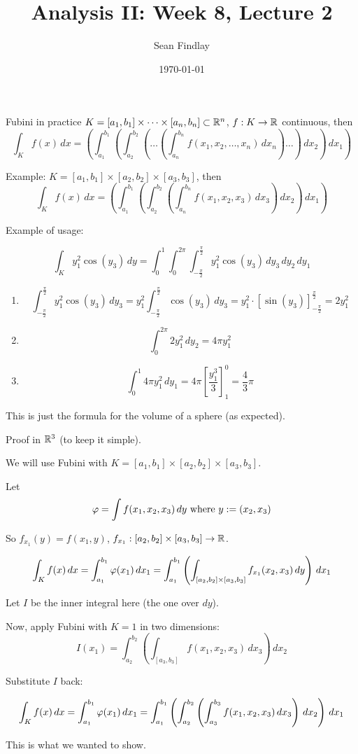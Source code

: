 \documentclass[12pt]{article}
\title{Analysis II: Week 8, Lecture 2}
\author{Sean Findlay}
\date{\today}
\begin{document}
\maketitle

\begin{corollary}{Fubini in practice}{}
$K = [a_1,b_1] \times \dots \times [a_n, b_n] \subset \mathbb{R}^n$, $f: K \rightarrow \mathbb{R}$ continuous, then $$
\int_{K} f(x) \,dx = \left(\int_{a_1}^{b_1} \left(\int_{a_2}^{b_2} \left(\dots \left(\int_{a_n}^{b_n} f(x_1, x_2, \dots, x_n) \,dx_n\right) \dots \right) \,dx_2\right) \,dx_1\right)
$$
\end{corollary}

Example: $K = [a_1,b_1] \times [a_2, b_2] \times [a_3, b_3]$, then 
$$
\int_{K} f(x) \,dx = \left(\int_{a_1}^{b_1} \left(\int_{a_2}^{b_2} \left(\int_{a_n}^{b_n} f(x_1, x_2, x_3) \,dx_3\right) \,dx_2\right) \,dx_1\right)
$$

Example of usage:

$$
\int_{K} y_1^2 \cos(y_3) \,dy = \int_{0}^{1} \int_{0}^{2\pi} \int_{-\frac{\pi}{2}}^{\frac{\pi}{2}} y_1^2 \cos(y_3) \,dy_3 \,dy_2 \,dy_1
$$

\begin{enumerate}
    \item $$
    \int_{-\frac{\pi}{2}}^{\frac{\pi}{2}} y_1^2 \cos(y_3) \,dy_3 = y_1^2 \int_{-\frac{\pi}{2}}^{\frac{\pi}{2}} \cos(y_3) \,dy_3 = y_1^2 \cdot [\sin(y_3)]_{-\frac{\pi}{2}}^{\frac{\pi}{2}} = 2y_1^2
    $$
    \item $$
    \int_{0}^{2\pi} 2y_1^2 \,dy_2 = 4\pi y_1^2
    $$
    \item $$
    \int_{0}^{1}4\pi y_1^2 \,dy_1 = 4 \pi [\frac{y_1^3}{3}]_{1}^{0} = \frac{4}{3}\pi
    $$
\end{enumerate}

This is just the formula for the volume of a sphere (as expected).

\begin{proofbox}
Proof in $\mathbb{R}^3$ (to keep it simple).

We will use Fubini with $K = [a_1,b_1] \times [a_2, b_2] \times [a_3, b_3]$.

Let 
$$
\varphi = \int f(x_1, x_2, x_3) \,dy \text{ where } y  := (x_2, x_3)
$$

So $f_{x_1}(y) = f(x_1, y)$, $f_{x_1}: [a_2, b_2] \times [a_3, b_3] \rightarrow \mathbb{R}$.

$$
\int_{K} f(x) \,dx = \int_{a_1}^{b_1} \varphi(x_1) \,dx_1 = \int_{a_1}^{b_1} \left(\int_{[a_2, b_2] \times [a_3, b_3]} f_{x_1}(x_2, x_3) \,dy\right) \,dx_1
$$

Let $I$ be the inner integral here (the one over $dy$).

Now, apply Fubini with $K = 1$ in two dimensions:
$$
I(x_1) = \int_{a_2}^{b_2} \left(\int_{[a_3, b_3]} f(x_1, x_2, x_3) \,dx_3\right) \,dx_2
$$

Substitute $I$ back:

$$
\int_{K} f(x) \,dx = \int_{a_1}^{b_1} \varphi(x_1) \,dx_1 = \int_{a_1}^{b_1} \left(\int_{a_2}^{b_2} \left(\int_{a_3}^{b_3} f(x_1, x_2, x_3) \,dx_3\right) \,dx_2\right) \,dx_1
$$

This is what we wanted to show.\end{proofbox}
\end{document}
